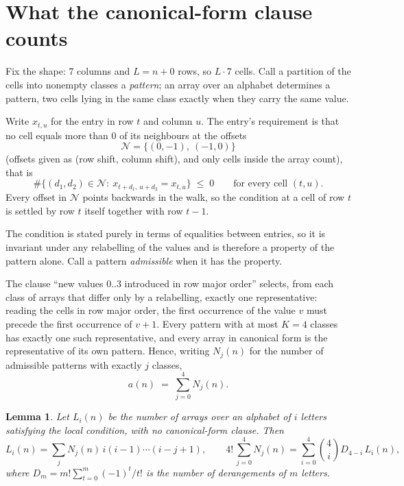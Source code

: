 \documentclass[11pt,a4paper]{article}
\theoremstyle{plain}
\newtheorem{lemma}[theorem]{Lemma}
\theoremstyle{definition}
\begin{document}
\section{What the canonical-form clause counts}

Fix the shape: $7$ columns and $L=n+0$ rows, so $L\cdot7$ cells. Call a
partition of the cells into nonempty classes a \emph{pattern}; an array over an alphabet
determines a pattern, two cells lying in the same class exactly when they carry the same
value.

Write $x_{t,u}$ for the entry in row $t$ and column $u$. The
entry's requirement is that no cell equals more than $0$ of its neighbours at the
offsets
\[
\mathcal N=\{(0,-1),\ (-1,0)\}
\]
(offsets given as (row shift, column shift), and only cells inside the array count),
that is
\begin{equation}\label{eq:loc}
\#\bigl\{(d_1,d_2)\in\mathcal N:\ x_{t+d_1,\,u+d_2}=x_{t,u}\bigr\}\;\le\;0
\qquad\text{for every cell }(t,u).
\end{equation}
Every offset in $\mathcal N$ points backwards in the walk, so the condition at a cell of
row $t$ is settled by row $t$ itself together with row $t-1$.

The condition is stated purely in terms of equalities between entries, so it is invariant
under any relabelling of the values and is therefore a property of the pattern alone. Call a
pattern \emph{admissible} when it has the property.

The clause ``new values $0..3$ introduced in row major order'' selects, from each class
of arrays that differ only by a relabelling, exactly one representative: reading the cells in
row major order, the first occurrence of the value $v$ must precede the first occurrence of
$v+1$. Every pattern with at most $K=4$ classes has exactly one such representative, and
every array in canonical form is the representative of its own pattern. Hence, writing
$N_j(n)$ for the number of admissible patterns with exactly $j$ classes,
\begin{equation}\label{eq:apat}
a(n)\;=\;\sum_{j=0}^{4}N_j(n).
\end{equation}

\begin{lemma}\label{lem:inv}
Let $L_i(n)$ be the number of arrays over an alphabet of $i$ letters satisfying the local
condition, with no canonical-form clause. Then
\[
L_i(n)=\sum_j N_j(n)\,i(i-1)\cdots(i-j+1),
\qquad
4!\,\sum_{j=0}^{4}N_j(n)=\sum_{i=0}^{4}\binom{4}{i}D_{4-i}\,L_i(n),
\]
where $D_m=m!\sum_{t=0}^{m}(-1)^t/t!$ is the number of derangements of $m$ letters.
\end{lemma}
\end{document}
